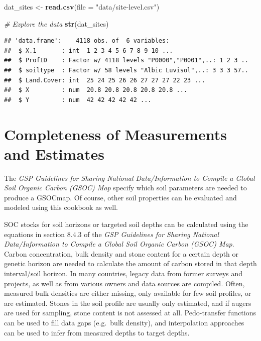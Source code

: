 \documentclass[10pt,b5paper,]{book}
\newenvironment{Shaded}{\begin{snugshade}}{\end{snugshade}}
\newcommand{\CommentTok}[1]{\textcolor[rgb]{0.56,0.35,0.01}{\textit{#1}}}
\newcommand{\DataTypeTok}[1]{\textcolor[rgb]{0.13,0.29,0.53}{#1}}
\newcommand{\KeywordTok}[1]{\textcolor[rgb]{0.13,0.29,0.53}{\textbf{#1}}}
\newcommand{\NormalTok}[1]{#1}
\newcommand{\StringTok}[1]{\textcolor[rgb]{0.31,0.60,0.02}{#1}}
\theoremstyle{definition}
\theoremstyle{definition}
\theoremstyle{definition}
\theoremstyle{remark}
\begin{document}
\begin{Shaded}
\begin{Highlighting}[]
\NormalTok{dat_sites <-}\StringTok{ }\KeywordTok{read.csv}\NormalTok{(}\DataTypeTok{file =} \StringTok{"data/site-level.csv"}\NormalTok{)}

\CommentTok{# Explore the data}
\KeywordTok{str}\NormalTok{(dat_sites)}
\end{Highlighting}
\end{Shaded}

\begin{verbatim}
## 'data.frame':    4118 obs. of  6 variables:
##  $ X.1       : int  1 2 3 4 5 6 7 8 9 10 ...
##  $ ProfID    : Factor w/ 4118 levels "P0000","P0001",..: 1 2 3 ..
##  $ soiltype  : Factor w/ 58 levels "Albic Luvisol",..: 3 3 3 57..
##  $ Land.Cover: int  25 24 25 26 26 27 27 27 22 23 ...
##  $ X         : num  20.8 20.8 20.8 20.8 20.8 ...
##  $ Y         : num  42 42 42 42 42 ...
\end{verbatim}

\hypertarget{completeness-of-measurements-and-estimates}{%
\section{Completeness of Measurements and
Estimates}\label{completeness-of-measurements-and-estimates}}

The \emph{GSP Guidelines for Sharing National Data/Information to
Compile a Global Soil Organic Carbon (GSOC) Map} specify which soil
parameters are needed to produce a GSOCmap. Of course, other soil
properties can be evaluated and modeled using this cookbook as well.

SOC stocks for soil horizons or targeted soil depths can be calculated
using the equations in section 8.4.3 of the \emph{GSP Guidelines for
Sharing National Data/Information to Compile a Global Soil Organic
Carbon (GSOC) Map}. Carbon concentration, bulk density and stone content
for a certain depth or genetic horizon are needed to calculate the
amount of carbon stored in that depth interval/soil horizon. In many
countries, legacy data from former surveys and projects, as well as from
various owners and data sources are compiled. Often, measured bulk
densities are either missing, only available for few soil profiles, or
are estimated. Stones in the soil profile are usually only estimated,
and if augers are used for sampling, stone content is not assessed at
all. Pedo-transfer functions can be used to fill data gaps (e.g.~bulk
density), and interpolation approaches can be used to infer from
measured depths to target depths.
\end{document}
